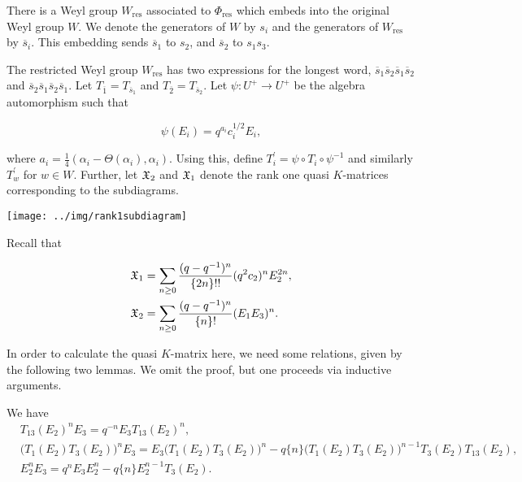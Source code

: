 \documentclass[a4 paper, 10pt]{article}
\begin{document}
There is a Weyl group $W_{\text{res}}$ associated to $\Phi_{\text{res}}$ which embeds into the original Weyl group $W$. We denote the generators of $W$ by $s_i$ and the generators of $W_{\text{res}}$ by $\overline{s}_i$. This embedding sends $\overline{s}_1$ to $s_2$, and $\overline{s}_2$ to $s_1s_3$. 

The restricted Weyl group $W_{\text{res}}$ has two expressions for the longest word, $\overline{s}_1\overline{s}_2\overline{s}_1\overline{s}_2$ and $\overline{s}_2\overline{s}_1\overline{s}_2\overline{s}_1$. Let $T_{\overline{1}} = T_{\overline{s}_1}$ and $T_{\overline{2}} = T_{\overline{s}_2}$. Let $\psi: U^+ \rightarrow U^+$ be the algebra automorphism such that

\begin{equation}
	\psi(E_i) = q^{a_i}c_i^{1/2}E_i,
\end{equation}


\noindent where $a_i = \frac{1}{4}(\alpha_i - \Theta(\alpha_i), \alpha_i)$. Using this, define $T_i^{\prime} = \psi \circ T_i \circ \psi^{-1}$ and similarly $T_w^{\prime}$ for $w \in W$. Further, let $\mathfrak{X}_2$ and $\mathfrak{X}_1$ denote the rank one quasi $K$-matrices corresponding to the subdiagrams.

\begin{center}
\texttt{[image: ../img/rank1subdiagram]}
\end{center}

\noindent Recall that

\begin{align}
	\mathfrak{X}_1 &= \sum_{n \geq 0} \dfrac{(q-q^{-1})^n}{ \{2n \}!! } (q^2c_2)^n E_2^{2n},\\
	\mathfrak{X}_2 &= \sum_{n \geq 0} \dfrac{(q-q^{-1})^n}{ \{n \}! } (E_1E_3)^n.	
\end{align}

\noindent In order to calculate the quasi $K$-matrix here, we need some relations, given by the following two lemmas. We omit the proof, but one proceeds via inductive arguments. 

\begin{lemma}\label{A3comm}
We have
\begin{align*}
&T_{13}(E_2)^{n} E_3 = q^{-n}E_3T_{13}(E_2)^n,\\
&\big( T_1(E_2)T_3(E_2) \big)^nE_3 = E_3 \big( T_1(E_2)T_3(E_2) \big)^n - q\{ n \} \big( T_1(E_2)T_3(E_2) \big)^{n-1} T_3(E_2)T_{13}(E_2),\\
&E_2^nE_3 = q^nE_3E_2^n - q\{ n \} E_2^{n-1}T_3(E_2). 
\end{align*}
\end{lemma}
\end{document}
